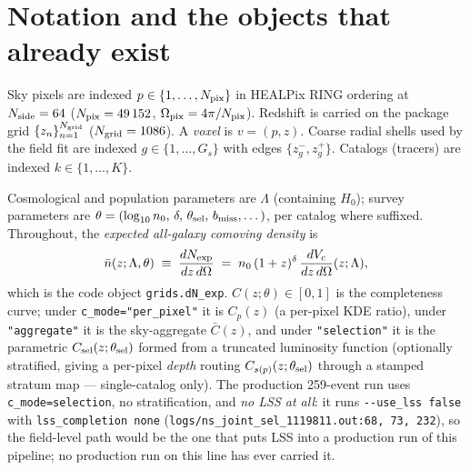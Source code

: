%
%
%

\section{Notation and the objects that already exist}
\label{sec:notation}

Sky pixels are indexed $p\in\{1,\dots,N_{\rm pix}\}$ in HEALPix RING ordering at
$N_{\rm side}=64$ ($N_{\rm pix}=49\,152$, $\Omega_{\rm pix}=4\pi/N_{\rm pix}$).
Redshift is carried on the package grid $\{z_n\}_{n=1}^{N_{\rm grid}}$
($N_{\rm grid}=1086$).  A \emph{voxel} is $v=(p,z)$.  Coarse radial shells used
by the field fit are indexed $g\in\{1,\dots,G_s\}$ with edges $\{z_g^-,z_g^+\}$.
Catalogs (tracers) are indexed $k\in\{1,\dots,K\}$.

Cosmological and population parameters are $\Lambda$ (containing $H_0$);
survey parameters are
$\theta=(\log_{10}n_0,\,\delta,\,\theta_{\rm sel},\,b_{\rm miss},\dots)$, per
catalog where suffixed.  Throughout, the \emph{expected all-galaxy comoving
density} is
\begin{equation}
  \bar n(z;\Lambda,\theta)\;\equiv\;\frac{dN_{\rm exp}}{dz\,d\Omega}
  \;=\;n_0\,(1+z)^{\delta}\,\frac{dV_c}{dz\,d\Omega}(z;\Lambda),
  \label{eq:dNexp}
\end{equation}
which is the code object \verb|grids.dN_exp|.  $C(z;\theta)\in[0,1]$ is the
completeness curve; under \verb|c_mode="per_pixel"| it is $C_p(z)$ (a per-pixel
KDE ratio), under \verb|"aggregate"| it is the sky-aggregate $\bar C(z)$, and
under \verb|"selection"| it is the parametric $C_{\rm sel}(z;\theta_{\rm sel})$
formed from a truncated luminosity function (optionally stratified, giving a
per-pixel \emph{depth} routing $C_{s(p)}(z;\theta_{\rm sel})$ through a stamped
stratum map --- single-catalog only).  The production 259-event run uses
\verb|c_mode=selection|, no stratification, and \emph{no LSS at all}: it runs
\verb|--use_lss false| with \verb|lss_completion none|
(\texttt{logs/ns\_joint\_sel\_1119811.out:68,\,73,\,232}), so the field-level
path would be the one that puts LSS into a production run of this pipeline; no
production run on this line has ever carried it.

